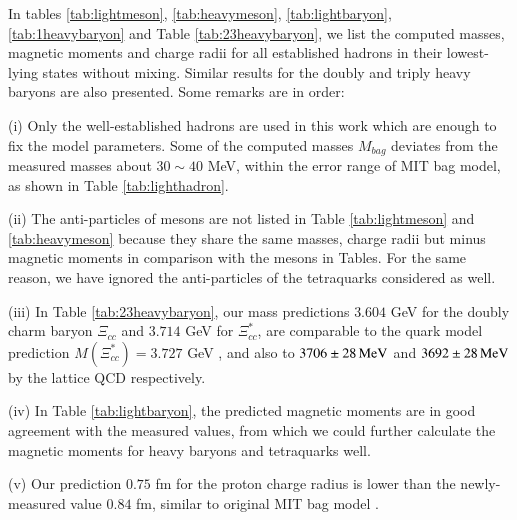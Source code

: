 \documentclass[prt,twocolumn,floatfix,nofootinbib]{revtex4}
\begin{document}
In tables \ref{tab:lightmeson}, \ref{tab:heavymeson}, \ref{tab:lightbaryon}, \ref{tab:1heavybaryon} and Table \ref{tab:23heavybaryon}, we list the computed masses, magnetic moments and charge radii for all established hadrons in their lowest-lying states without mixing. Similar results for the doubly and triply heavy baryons are also presented. Some remarks are in order:

(i) Only the well-established hadrons are used in this work which are enough to fix the model parameters.
Some of the computed masses $M_{bag}$ deviates from the measured masses about $30\sim 40$ MeV, within the error range of MIT bag model, as shown in Table \ref{tab:lighthadron}.

(ii) The anti-particles of mesons are not listed in Table \ref{tab:lightmeson} and \ref{tab:heavymeson} because they share the same masses, charge radii but minus magnetic moments in comparison with the mesons in Tables.
For the same reason, we have ignored the anti-particles of the tetraquarks considered as well.

(iii) In Table \ref{tab:23heavybaryon}, our mass predictions $3.604$ GeV for the doubly charm baryon $\Xi_{cc}$ and $3.714$ GeV for $\Xi_{cc}^{\ast}$,
are comparable to the quark model prediction $M\left(\Xi_{cc}^{\ast}\right)=3.727$ GeV \cite{Ebert:2004ck}, and also to $3706\pm 28\,{\rm MeV}$ and $3692\pm 28\,{\rm MeV}$ by the lattice QCD \cite{PACS-CS:2013vie,Brown:2014ena} respectively.

(iv) In Table \ref{tab:lightbaryon}, the predicted magnetic moments are in good agreement with the measured values, from which we could further calculate the magnetic moments for heavy baryons and tetraquarks well.

(v) Our prediction $0.75$ fm for the proton charge radius is lower than the newly-measured value $0.84$ fm, similar to original MIT bag model \cite{Johnson:1975zp,DeGrand:1975cf}.
\end{document}

